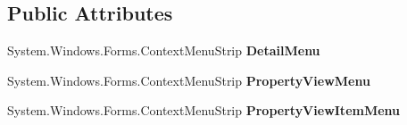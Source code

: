 \subsection*{Public Attributes}
\begin{DoxyCompactItemize}
\item 
\hypertarget{classlib_watcher_dialog_1_1_property_form_3_01_t_00_01_t2_01_4_a28c82159b0a9f78e7726c35efc380566}{System.\+Windows.\+Forms.\+Context\+Menu\+Strip {\bfseries Detail\+Menu}}\label{classlib_watcher_dialog_1_1_property_form_3_01_t_00_01_t2_01_4_a28c82159b0a9f78e7726c35efc380566}

\item 
\hypertarget{classlib_watcher_dialog_1_1_property_form_3_01_t_00_01_t2_01_4_a9c6966acf645df28cfacb6149f231070}{System.\+Windows.\+Forms.\+Context\+Menu\+Strip {\bfseries Property\+View\+Menu}}\label{classlib_watcher_dialog_1_1_property_form_3_01_t_00_01_t2_01_4_a9c6966acf645df28cfacb6149f231070}

\item 
\hypertarget{classlib_watcher_dialog_1_1_property_form_3_01_t_00_01_t2_01_4_a4699448a84da155f620ef18318752445}{System.\+Windows.\+Forms.\+Context\+Menu\+Strip {\bfseries Property\+View\+Item\+Menu}}\label{classlib_watcher_dialog_1_1_property_form_3_01_t_00_01_t2_01_4_a4699448a84da155f620ef18318752445}

\end{DoxyCompactItemize}
